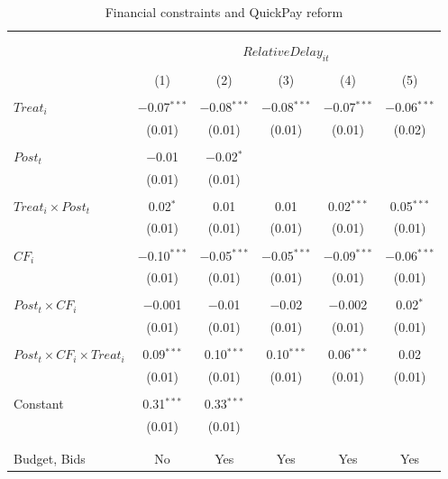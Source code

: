 \documentclass[
]{article}
\begin{document}
\begin{table}[H] \centering 
  \caption{Financial constraints and QuickPay reform} 
  \label{} 
\small 
\begin{tabular}{@{\extracolsep{-2pt}}lccccc} 
\\[-1.8ex]\hline 
\hline \\[-1.8ex] 
\\[-1.8ex] & \multicolumn{5}{c}{$RelativeDelay_{it}$} \\ 
\\[-1.8ex] & (1) & (2) & (3) & (4) & (5)\\ 
\hline \\[-1.8ex] 
 $Treat_i$ & $-$0.07$^{***}$ & $-$0.08$^{***}$ & $-$0.08$^{***}$ & $-$0.07$^{***}$ & $-$0.06$^{***}$ \\ 
  & (0.01) & (0.01) & (0.01) & (0.01) & (0.02) \\ 
  & & & & & \\ 
 $Post_t$ & $-$0.01 & $-$0.02$^{*}$ &  &  &  \\ 
  & (0.01) & (0.01) &  &  &  \\ 
  & & & & & \\ 
 $Treat_i \times Post_t$ & 0.02$^{*}$ & 0.01 & 0.01 & 0.02$^{***}$ & 0.05$^{***}$ \\ 
  & (0.01) & (0.01) & (0.01) & (0.01) & (0.01) \\ 
  & & & & & \\ 
 $CF_i$ & $-$0.10$^{***}$ & $-$0.05$^{***}$ & $-$0.05$^{***}$ & $-$0.09$^{***}$ & $-$0.06$^{***}$ \\ 
  & (0.01) & (0.01) & (0.01) & (0.01) & (0.01) \\ 
  & & & & & \\ 
 $Post_t \times CF_i$ & $-$0.001 & $-$0.01 & $-$0.02 & $-$0.002 & 0.02$^{*}$ \\ 
  & (0.01) & (0.01) & (0.01) & (0.01) & (0.01) \\ 
  & & & & & \\ 
 $Post_t \times CF_i \times Treat_i$ & 0.09$^{***}$ & 0.10$^{***}$ & 0.10$^{***}$ & 0.06$^{***}$ & 0.02 \\ 
  & (0.01) & (0.01) & (0.01) & (0.01) & (0.01) \\ 
  & & & & & \\ 
 Constant & 0.31$^{***}$ & 0.33$^{***}$ &  &  &  \\ 
  & (0.01) & (0.01) &  &  &  \\ 
  & & & & & \\ 
\hline \\[-1.8ex] 
Budget, Bids & No & Yes & Yes & Yes & Yes \\ 

\end{tabular}
\end{table}
\end{document}
